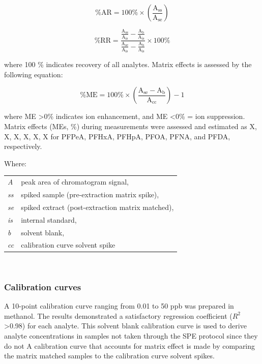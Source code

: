 \begin{equation}
    \label{eq:Recovery}
    \mathrm{\% AR  = 100 \% \times \left ( \frac{A_{ss}}{A_{se}} \right ) }
\end{equation}

\begin{equation}
    \label{eq:relativeRecovery}
    \mathrm{\% RR = \frac{\frac{A_{ss}}{A_{is}}-\frac{A_{b}}{A_{is}}}{\frac{A_{se}}{A_{is}}-\frac{A_{b}}{A_{is}}}\times 100 \% }
\end{equation}

where 100 \% indicates recovery of all analytes. Matrix effects is assessed by the following equation:

\begin{equation}
    \label{eq:ME}
    \mathrm{\% ME = 100 \% \times \left(\frac{A_{se} - A_b}{A_{cc}}\right )-1 }
\end{equation}

where ME \textgreater 0\% indicates ion enhancement, and ME \textless 0\% = ion suppression. Matrix effects (MEs, \%) during measurements were assessed and estimated as X, X, X, X, X, X for PFPeA, PFHxA, PFHpA, PFOA, PFNA, and PFDA, respectively.

Where: \newline
\newline
\begin{tabular}{p{1cm}p{20cm}}
    \textit{A}   & peak area of chromatogram signal, \\
    \textit{ss}  & spiked sample (pre-extraction matrix spike), \\
    \textit{se}  & spiked extract (post-extraction matrix matched), \\
    \textit{is}  & internal standard, \\
    \textit{b}   & solvent blank, \\
    \textit{cc}  & calibration curve solvent spike \\
\end{tabular} \\

\subsubsection{Calibration curves}
A 10-point calibration curve ranging from 0.01 to 50 ppb was prepared in methanol. The results demonstrated a satisfactory regression coefficient ($R^2$ \textgreater 0.98) for each analyte. This solvent blank calibration curve is used to derive analyte concentrations in samples not taken through the SPE protocol since they do not  A calibration curve that accounts for matrix effect is made by comparing the matrix matched samples to the calibration curve solvent spikes.

